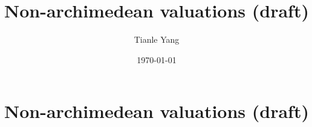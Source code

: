 \documentclass{noteformyself}
\title{Non-archimedean valuations (draft)}
\author{Tianle Yang}
\date{\today}
\begin{document}
    \maketitle

    \section{Non-archimedean valuations (draft)}



\end{document}

